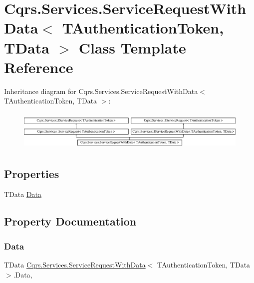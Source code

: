 \hypertarget{classCqrs_1_1Services_1_1ServiceRequestWithData}{}\section{Cqrs.\+Services.\+Service\+Request\+With\+Data$<$ T\+Authentication\+Token, T\+Data $>$ Class Template Reference}
\label{classCqrs_1_1Services_1_1ServiceRequestWithData}
Inheritance diagram for Cqrs.\+Services.\+Service\+Request\+With\+Data$<$ T\+Authentication\+Token, T\+Data $>$\+:\begin{figure}[H]
\begin{center}
\leavevmode
\includegraphics[height=1.926605cm]{classCqrs_1_1Services_1_1ServiceRequestWithData}
\end{center}
\end{figure}
\subsection*{Properties}
\begin{DoxyCompactItemize}
\item 
T\+Data \hyperlink{classCqrs_1_1Services_1_1ServiceRequestWithData_aab0d15e170d06c7170be934f9705937b_aab0d15e170d06c7170be934f9705937b}{Data}
\end{DoxyCompactItemize}


\subsection{Property Documentation}
\mbox{\label{classCqrs_1_1Services_1_1ServiceRequestWithData_aab0d15e170d06c7170be934f9705937b_aab0d15e170d06c7170be934f9705937b}} 
\subsubsection{\texorpdfstring{Data}{Data}}
{\footnotesize\ttfamily T\+Data \hyperlink{classCqrs_1_1Services_1_1ServiceRequestWithData}{Cqrs.\+Services.\+Service\+Request\+With\+Data}$<$ T\+Authentication\+Token, T\+Data $>$.Data\hspace{0.3cm}{\ttfamily [get]}, {\ttfamily [set]}}

